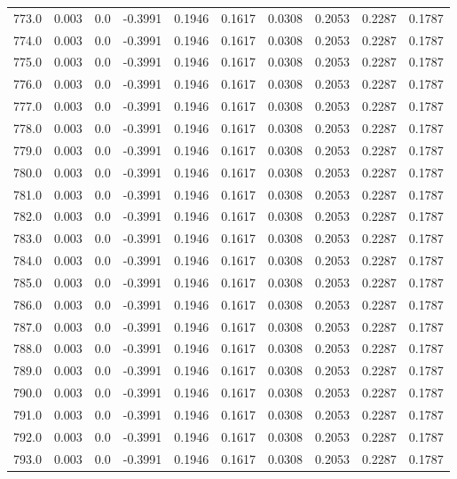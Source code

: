 \begin{longtable}{lrrrrrrrrr}
773.0 & 0.003 & 0.0 & -0.3991 & 0.1946 & 0.1617 & 0.0308 & 0.2053 & 0.2287 & 0.1787 \\
774.0 & 0.003 & 0.0 & -0.3991 & 0.1946 & 0.1617 & 0.0308 & 0.2053 & 0.2287 & 0.1787 \\
775.0 & 0.003 & 0.0 & -0.3991 & 0.1946 & 0.1617 & 0.0308 & 0.2053 & 0.2287 & 0.1787 \\
776.0 & 0.003 & 0.0 & -0.3991 & 0.1946 & 0.1617 & 0.0308 & 0.2053 & 0.2287 & 0.1787 \\
777.0 & 0.003 & 0.0 & -0.3991 & 0.1946 & 0.1617 & 0.0308 & 0.2053 & 0.2287 & 0.1787 \\
778.0 & 0.003 & 0.0 & -0.3991 & 0.1946 & 0.1617 & 0.0308 & 0.2053 & 0.2287 & 0.1787 \\
779.0 & 0.003 & 0.0 & -0.3991 & 0.1946 & 0.1617 & 0.0308 & 0.2053 & 0.2287 & 0.1787 \\
780.0 & 0.003 & 0.0 & -0.3991 & 0.1946 & 0.1617 & 0.0308 & 0.2053 & 0.2287 & 0.1787 \\
781.0 & 0.003 & 0.0 & -0.3991 & 0.1946 & 0.1617 & 0.0308 & 0.2053 & 0.2287 & 0.1787 \\
782.0 & 0.003 & 0.0 & -0.3991 & 0.1946 & 0.1617 & 0.0308 & 0.2053 & 0.2287 & 0.1787 \\
783.0 & 0.003 & 0.0 & -0.3991 & 0.1946 & 0.1617 & 0.0308 & 0.2053 & 0.2287 & 0.1787 \\
784.0 & 0.003 & 0.0 & -0.3991 & 0.1946 & 0.1617 & 0.0308 & 0.2053 & 0.2287 & 0.1787 \\
785.0 & 0.003 & 0.0 & -0.3991 & 0.1946 & 0.1617 & 0.0308 & 0.2053 & 0.2287 & 0.1787 \\
786.0 & 0.003 & 0.0 & -0.3991 & 0.1946 & 0.1617 & 0.0308 & 0.2053 & 0.2287 & 0.1787 \\
787.0 & 0.003 & 0.0 & -0.3991 & 0.1946 & 0.1617 & 0.0308 & 0.2053 & 0.2287 & 0.1787 \\
788.0 & 0.003 & 0.0 & -0.3991 & 0.1946 & 0.1617 & 0.0308 & 0.2053 & 0.2287 & 0.1787 \\
789.0 & 0.003 & 0.0 & -0.3991 & 0.1946 & 0.1617 & 0.0308 & 0.2053 & 0.2287 & 0.1787 \\
790.0 & 0.003 & 0.0 & -0.3991 & 0.1946 & 0.1617 & 0.0308 & 0.2053 & 0.2287 & 0.1787 \\
791.0 & 0.003 & 0.0 & -0.3991 & 0.1946 & 0.1617 & 0.0308 & 0.2053 & 0.2287 & 0.1787 \\
792.0 & 0.003 & 0.0 & -0.3991 & 0.1946 & 0.1617 & 0.0308 & 0.2053 & 0.2287 & 0.1787 \\
793.0 & 0.003 & 0.0 & -0.3991 & 0.1946 & 0.1617 & 0.0308 & 0.2053 & 0.2287 & 0.1787 \\

\end{longtable}
